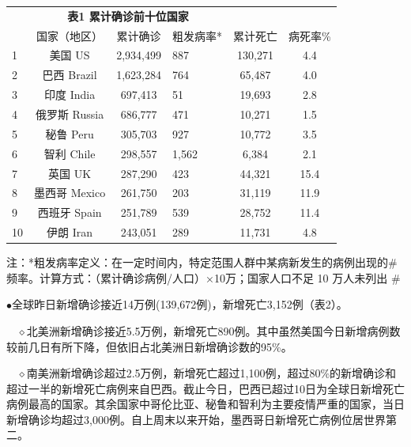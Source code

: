 \documentclass[
]{article}
\begin{document}
\begin{table}[H]
   \centering \begin{table}[H]
\centering\begingroup\fontsize{20}{22}\selectfont

\begin{tabular}{lcclcc}
\toprule
\multicolumn{0}{c}{\textbf{ }} & \multicolumn{3}{c}{\textbf{表1 累计确诊前十位国家}} \\
  & 国家（地区） & 累计确诊 & 粗发病率* & 累计死亡 & 病死率\%\\
\midrule
\rowcolor{gray!6}  1 & 美国 US & 2,934,499 & 887 & 130,271 & 4.4\\
2 & 巴西 Brazil & 1,623,284 & 764 & 65,487 & 4.0\\
\rowcolor{gray!6}  3 & 印度 India & 697,413 & 51 & 19,693 & 2.8\\
4 & 俄罗斯 Russia & 686,777 & 471 & 10,271 & 1.5\\
\rowcolor{gray!6}  5 & 秘鲁 Peru & 305,703 & 927 & 10,772 & 3.5\\
6 & 智利 Chile & 298,557 & 1,562 & 6,384 & 2.1\\
\rowcolor{gray!6}  7 & 英国 UK & 287,290 & 423 & 44,321 & 15.4\\
8 & 墨西哥 Mexico & 261,750 & 203 & 31,119 & 11.9\\
\rowcolor{gray!6}  9 & 西班牙 Spain & 251,789 & 539 & 28,752 & 11.4\\
10 & 伊朗 Iran & 243,051 & 289 & 11,731 & 4.8\\
\bottomrule
\end{tabular}
\endgroup{}
\end{table} \begin{tablenotes}
       \fontsize{15}{15}
       \selectfont
       \item 注：*粗发病率定义：在一定时间内，特定范围人群中某病新发生的病例出现的#频率。计算方式：（累计确诊病例/人口）×10万；国家人口不足 10 万人未列出 #%
     \end{tablenotes}
\end{table}

\(\bullet\)全球昨日新增确诊接近14万例(139,672例)，新增死亡3,152例（表2）。

\(\quad\)\(\diamond\)北美洲新增确诊接近5.5万例，新增死亡890例。其中虽然美国今日新增病例数较前几日有所下降，但依旧占北美洲日新增确诊数的95\%。

\(\quad\)\(\diamond\)南美洲新增确诊超过2.5万例，新增死亡超过1,100例，超过80\%的新增确诊和超过一半的新增死亡病例来自巴西。截止今日，巴西已超过10日为全球日新增死亡病例最高的国家。其余国家中哥伦比亚、秘鲁和智利为主要疫情严重的国家，当日新增确诊均超过3,000例。自上周末以来开始，墨西哥日新增死亡病例位居世界第二。
\end{document}
